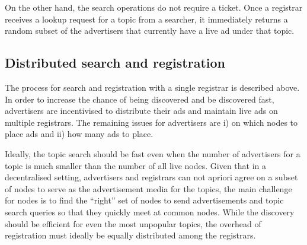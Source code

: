 On the other hand, the search operations do not require a ticket. Once a registrar receives a lookup request for a topic from a searcher, it immediately returns a random subset of the advertisers that currently have a live ad under that topic. 

\subsection{Distributed search and registration}

The process for search and registration with a single registrar is described above. In order to increase the chance of being discovered and be discovered fast, advertisers are incentivised to distribute their ads and maintain live ads on multiple registrars. The remaining issues for advertisers are i) on which nodes to place ads and ii) how many ads to place.  

Ideally, the topic search should be fast even when the number of advertisers for a topic is much smaller than the number of all live nodes. Given that in a decentralised setting, advertisers and registrars can not apriori agree on a subset of nodes to serve as the advertisement media for the topics, the main challenge for nodes is to find the ``right'' set of nodes to send advertisements and topic search queries so that they quickly meet at common nodes. While the discovery should be efficient for even the most unpopular topics, the overhead of registration must ideally be equally distributed among the registrars. 

